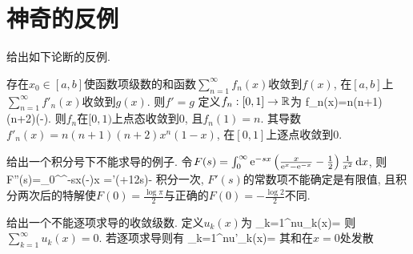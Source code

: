 \chapter{神奇的反例}

给出如下论断的反例.

存在$x_0\in[a,b]$使函数项级数的和函数$\sum_{n=1}^{\infty}f_n(x)$收敛到$f(x)$, 
在$[a,b]$上$\sum_{n=1}^{\infty}f'_n(x)$收敛到$g(x)$. 则$f'=g$
\eq
\ba
定义$f_n: [0,1]\to\Bbb R$为
\bee
f_n(x)=n(n+1)(n+2)\left(-\right).
\eee
则$f_n$在$[0,1)$上点态收敛到$0$, 且$f_n(1)=n$. 其导数$f'_n(x)=n(n+1)(n+2)x^n(1-x)$, 在$[0,1]$上逐点收敛到$0$.
\ea

给出一个积分号下不能求导的例子.
\eq
\ba
令$F(s)=\int_{0}^{\infty}\mathrm{e}^{-sx}\left(\frac{x}{\mathrm{e}^x-\mathrm{e}^{-x}}-\frac12\right)\frac{1}{x^2}\,\mathrm{d} x$,
则
\bee
F''(s)=\int_{0}^{\infty}\ue^{-sx}\left(-\right)\ud x
  =\psi'\left(+\frac12s\right)-
\eee
积分一次, $F'(s)$的常数项不能确定是有限值, 且积分两次后的特解使$F(0)=\frac{\log\pi}{2}$与正确的$F(0)=-\frac{\log2}{2}$不同.
\ea

给出一个不能逐项求导的收敛级数.
\eq
\ba
定义$u_k(x)$为
\bee
\sum_{k=1}^{n}u_k(x)=
\eee
则$\sum_{k=1}^{\infty}u_k(x)=0$. 若逐项求导则有
\bee
\sum_{k=1}^{n}u'_k(x)=
\eee
其和在$x=0$处发散
\ea